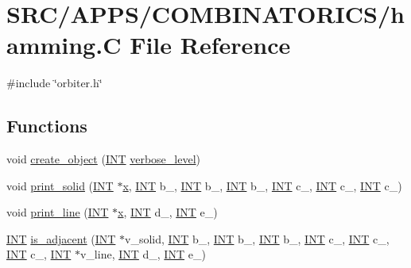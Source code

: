 \hypertarget{hamming_8_c}{}\section{S\+R\+C/\+A\+P\+P\+S/\+C\+O\+M\+B\+I\+N\+A\+T\+O\+R\+I\+C\+S/hamming.C File Reference}
\label{hamming_8_c}
{\ttfamily \#include \char`\"{}orbiter.\+h\char`\"{}}\newline
\subsection*{Functions}
\begin{DoxyCompactItemize}
\item 
void \mbox{\hyperlink{hamming_8_c_a290a0a0fa4965131997904ad9fe1840b}{create\+\_\+object}} (\mbox{\hyperlink{galois_8h_a09fddde158a3a20bd2dcadb609de11dc}{I\+NT}} \mbox{\hyperlink{simeon_8_c_a818073fbcc2f439e7c56952f67386122}{verbose\+\_\+level}})
\item 
void \mbox{\hyperlink{hamming_8_c_a09fb17dc14df1d82b6c0aad094d47ad0}{print\+\_\+solid}} (\mbox{\hyperlink{galois_8h_a09fddde158a3a20bd2dcadb609de11dc}{I\+NT}} $\ast$\mbox{\hyperlink{alphabet2_8_c_a6150e0515f7202e2fb518f7206ed97dc}{x}}, \mbox{\hyperlink{galois_8h_a09fddde158a3a20bd2dcadb609de11dc}{I\+NT}} b\+\_, \mbox{\hyperlink{galois_8h_a09fddde158a3a20bd2dcadb609de11dc}{I\+NT}} b\+\_, \mbox{\hyperlink{galois_8h_a09fddde158a3a20bd2dcadb609de11dc}{I\+NT}} b\+\_, \mbox{\hyperlink{galois_8h_a09fddde158a3a20bd2dcadb609de11dc}{I\+NT}} c\+\_, \mbox{\hyperlink{galois_8h_a09fddde158a3a20bd2dcadb609de11dc}{I\+NT}} c\+\_, \mbox{\hyperlink{galois_8h_a09fddde158a3a20bd2dcadb609de11dc}{I\+NT}} c\+\_)
\item 
void \mbox{\hyperlink{hamming_8_c_ad20d3c9c9c1238a35ca198845dc05dd1}{print\+\_\+line}} (\mbox{\hyperlink{galois_8h_a09fddde158a3a20bd2dcadb609de11dc}{I\+NT}} $\ast$\mbox{\hyperlink{alphabet2_8_c_a6150e0515f7202e2fb518f7206ed97dc}{x}}, \mbox{\hyperlink{galois_8h_a09fddde158a3a20bd2dcadb609de11dc}{I\+NT}} d\+\_, \mbox{\hyperlink{galois_8h_a09fddde158a3a20bd2dcadb609de11dc}{I\+NT}} e\+\_)
\item 
\mbox{\hyperlink{galois_8h_a09fddde158a3a20bd2dcadb609de11dc}{I\+NT}} \mbox{\hyperlink{hamming_8_c_a48eceff252fd58a4a334493420b4f05f}{is\+\_\+adjacent}} (\mbox{\hyperlink{galois_8h_a09fddde158a3a20bd2dcadb609de11dc}{I\+NT}} $\ast$v\+\_\+solid, \mbox{\hyperlink{galois_8h_a09fddde158a3a20bd2dcadb609de11dc}{I\+NT}} b\+\_, \mbox{\hyperlink{galois_8h_a09fddde158a3a20bd2dcadb609de11dc}{I\+NT}} b\+\_, \mbox{\hyperlink{galois_8h_a09fddde158a3a20bd2dcadb609de11dc}{I\+NT}} b\+\_, \mbox{\hyperlink{galois_8h_a09fddde158a3a20bd2dcadb609de11dc}{I\+NT}} c\+\_, \mbox{\hyperlink{galois_8h_a09fddde158a3a20bd2dcadb609de11dc}{I\+NT}} c\+\_, \mbox{\hyperlink{galois_8h_a09fddde158a3a20bd2dcadb609de11dc}{I\+NT}} c\+\_, \mbox{\hyperlink{galois_8h_a09fddde158a3a20bd2dcadb609de11dc}{I\+NT}} $\ast$v\+\_\+line, \mbox{\hyperlink{galois_8h_a09fddde158a3a20bd2dcadb609de11dc}{I\+NT}} d\+\_, \mbox{\hyperlink{galois_8h_a09fddde158a3a20bd2dcadb609de11dc}{I\+NT}} e\+\_)

\end{DoxyCompactItemize}
